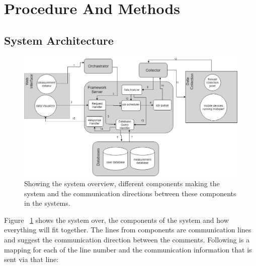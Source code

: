 \section{Procedure And Methods}
\subsection{System Architecture}
\begin{figure}
	\begin{center}
		\includegraphics[width=1\linewidth]{res/system.jpeg}
	\end{center}
	\caption{Showing the system overview, different components making the system and the communication directions between these components in the systems.}
	\label{figure:system}
\end{figure}
Figure ~\ref{figure:system} shows the system over, the components of the system and how everything will fit together. The lines from components are communication lines and suggest the communication direction between the comments. Following is a mapping for each of the line number and the communication information that is sent via that line:
